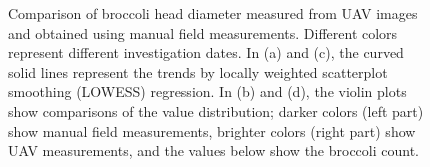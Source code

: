 \begin{figure}[htb]
  \begin{center}
  \end{center}
  \caption[Comparison of broccoli head diameter measured from UAV images and obtained using manual field measurements]{
    Comparison of broccoli head diameter measured from UAV images and obtained using manual field measurements. Different colors represent different investigation dates. 
    In (a) and (c), the curved solid lines represent the trends by locally weighted scatterplot smoothing (LOWESS) regression. 
    In (b) and (d), the violin plots show comparisons of the value distribution; 
    darker colors (left part) show manual field measurements, brighter colors (right part) show UAV measurements, and the values below show the broccoli count.
  }
  \label{fig:cp4.1}
\end{figure}